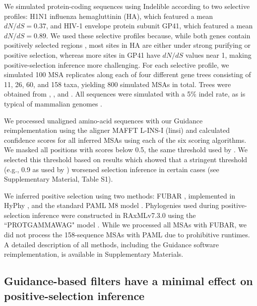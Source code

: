 \documentclass[11pt]{article}
\begin{document}
We simulated protein-coding sequences using Indelible \citep{Fletcher2009} according to two selective profiles: H1N1 influenza hemagluttinin (HA), which featured a mean $dN/dS = 0.37$, and HIV-1 envelope protein subunit GP41, which featured a mean $dN/dS = 0.89$. We used these selective profiles because, while both genes contain positively selected regions \citep{Bush1999, Frost2001, Bandawe2008, Meyer2012}, most sites in HA are either under strong purifying or positive selection, whereas more sites in GP41 have $dN/dS$ values near 1, making positive-selection inference more challenging. For each selective profile, we simulated 100 MSA replicates along each of four different gene trees consisting of 11, 26, 60, and 158 taxa, yielding 800 simulated MSAs in total.  Trees were obtained from \citet{Spielman2013}, \citet{Yang2011}, and \citet{Betancur2013}. All sequences were simulated with a 5\% indel rate, as is typical of mammalian genomes \citep{Cooper2004}.

We processed unaligned amino-acid sequences with our Guidance reimplementation using the aligner MAFFT L-INS-I (linsi) \citep{Katoh2002,Katoh2005} and calculated confidence scores for all inferred MSAs using each of the six scoring algorithms. We masked all positions with scores below 0.5, the same threshold used by \citet{Jordan2012}. We selected this threshold based on results which showed that a stringent threshold (e.g., 0.9 as used by \citealt{Privman2012}) worsened selection inference in certain cases (see Supplementary Material, Table S1).

We inferred positive selection using two methods: FUBAR \citep{Murrell2013}, implemented in HyPhy \citep{Pond2005}, and the standard PAML M8 model \citep{Yang2000, Yang2007}. Phylogenies used during positive-selection inference were constructed in RAxMLv7.3.0 using the ``PROTGAMMAWAG" model \citep{Stamatakis2006}. While we processed all MSAs with FUBAR, we did not process the 158-sequence MSAs with PAML due to prohibitive runtimes. A detailed description of all methods, including the Guidance software reimplementation, is available in Supplementary Materials.


\subsection*{Guidance-based filters have a minimal effect on positive-selection inference}
\end{document}
